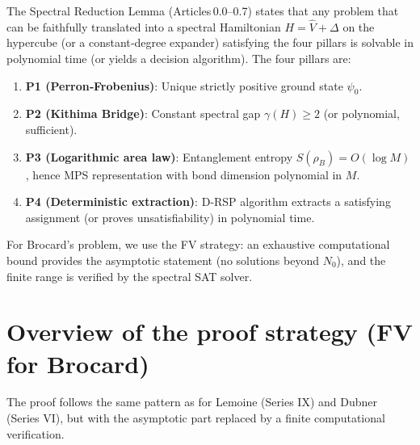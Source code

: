 \documentclass[11pt,a4paper]{article}
\begin{document}
The Spectral Reduction Lemma (Articles 0.0–0.7) states that any problem that can be faithfully translated into a spectral Hamiltonian $H = \hat{V} + \Delta$ on the hypercube (or a constant‑degree expander) satisfying the four pillars is solvable in polynomial time (or yields a decision algorithm). The four pillars are:

\begin{enumerate}
\item \textbf{P1 (Perron‑Frobenius)}: Unique strictly positive ground state $\psi_0$.
\item \textbf{P2 (Kithima Bridge)}: Constant spectral gap $\gamma(H) \ge 2$ (or polynomial, sufficient).
\item \textbf{P3 (Logarithmic area law)}: Entanglement entropy $S(\rho_B)=O(\log M)$, hence MPS representation with bond dimension polynomial in $M$.
\item \textbf{P4 (Deterministic extraction)}: D‑RSP algorithm extracts a satisfying assignment (or proves unsatisfiability) in polynomial time.
\end{enumerate}

For Brocard's problem, we use the FV strategy: an exhaustive computational bound provides the asymptotic statement (no solutions beyond $N_0$), and the finite range is verified by the spectral SAT solver.

\section{Overview of the proof strategy (FV for Brocard)}

The proof follows the same pattern as for Lemoine (Series IX) and Dubner (Series VI), but with the asymptotic part replaced by a finite computational verification.
\end{document}
